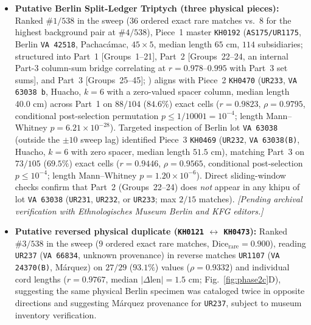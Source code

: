 \documentclass[11pt,a4paper]{article}
\begin{document}
\begin{itemize}
  \item \textbf{Putative Berlin Split-Ledger Triptych (three physical pieces):} Ranked \textbf{$\#1/538$} in the sweep ($36$ ordered exact rare matches vs.\ $8$ for the highest background pair at $\#4/538$), Piece~1 master \texttt{KH0192} (\texttt{AS175/UR1175}, Berlin \texttt{VA 42518}, Pachac{\'a}mac, $45\times 5$, median length $65\text{ cm}$, $114$ subsidiaries; structured into Part~1 [Groups~1--21], Part~2 [Groups~22--24, an internal Part-3 column-sum bridge correlating at $r = 0.978\text{--}0.995$ with Part~3 set sums], and Part~3 [Groups~25--45]; \citealt{ascher1981code}) aligns with Piece~2 \texttt{KH0470} (\texttt{UR233}, \texttt{VA 63038 b}, Huacho, $k=6$ with a zero-valued spacer column, median length $40.0\text{ cm}$) across Part~1 on $88/104$ ($84.6\%$) exact cells ($r = 0.9823$, $\rho = 0.9795$, conditional post-selection permutation $p \le 1/10001 = 10^{-4}$; length Mann--Whitney $p = 6.21 \times 10^{-28}$). Targeted inspection of Berlin lot \texttt{VA 63038} (outside the $\pm 10$ sweep lag) identified Piece~3 \texttt{KH0469} (\texttt{UR232}, \texttt{VA 63038(B)}, Huacho, $k=6$ with zero spacer, median length $51.5\text{ cm}$), matching Part~3 on $73/105$ ($69.5\%$) exact cells ($r = 0.9446$, $\rho = 0.9565$, conditional post-selection $p \le 10^{-4}$; length Mann--Whitney $p = 1.20 \times 10^{-6}$). Direct sliding-window checks confirm that Part~2 (Groups~22--24) does \emph{not} appear in any khipu of lot \texttt{VA 63038} (\texttt{UR231}, \texttt{UR232}, or \texttt{UR233}; max $2/15$ matches). \emph{[Pending archival verification with Ethnologisches Museum Berlin and KFG editors.]}
  \item \textbf{Putative reversed physical duplicate (\texttt{KH0121} $\leftrightarrow$ \texttt{KH0473}):} Ranked \textbf{$\#3/538$} in the sweep ($9$ ordered exact rare matches, $\text{Dice}_{\mathrm{rare}} = 0.900$), reading \texttt{UR237} (\texttt{VA 66834}, unknown provenance) in reverse matches \texttt{UR1107} (\texttt{VA 24370(B)}, M{\'a}rquez) on $27/29$ ($93.1\%$) values ($\rho = 0.9332$) and individual cord lengths ($r = 0.9767$, median $|\Delta\text{len}| = 1.5\text{ cm}$; Fig.~\ref{fig:phase2c}D), suggesting the same physical Berlin specimen was cataloged twice in opposite directions and suggesting M{\'a}rquez provenance for \texttt{UR237}, subject to museum inventory verification.
\end{itemize}
\end{document}
